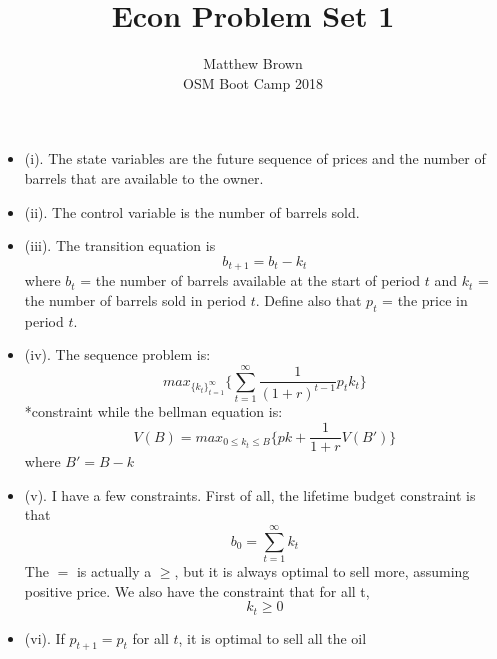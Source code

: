 \documentclass[12pt]{article}
\newenvironment{problem}[2][Problem]{\begin{trivlist}
\item[\hskip \labelsep {\bfseries #1}\hskip \labelsep {\bfseries #2.}]}{\end{trivlist}}
\theoremstyle{definition}
\theoremstyle{definition}
\theoremstyle{definition}
\theoremstyle{definition}
\begin{document}
\title{Econ Problem Set 1}
\author{Matthew Brown\\ 
OSM Boot Camp 2018} %
 
\maketitle
 
\begin{problem}{1}
\begin{itemize}
\item (i). The state variables are the future sequence of prices and the number of barrels that are available to the owner.
\item (ii). The control variable is the number of barrels sold.
\item (iii). The transition equation is 
$$ b_{t+1} = b_t - k_t $$
where $b_t$ = the number of barrels available at the start of period $t$ and $k_t$ = the number of barrels sold in period $t$. Define also that $p_t$ = the price in period $t$.
\item (iv). The sequence problem is:
$$ max_{\{k_t\}_{t=1}^\infty} \bigg\{ \sum_{t=1}^{\infty} \frac{1}{(1+r)^{t-1}}p_tk_t \bigg\} $$
*constraint
while the bellman equation is:
$$ V(B) = max_{0 \leq k_t \leq B} \bigg\{ pk + \frac{1}{1+r}V(B') \bigg\} $$
where $B' = B-k$
\item (v). I have a few constraints. First of all, the lifetime budget constraint is that
$$b_0 = \sum_{t=1}^\infty k_t$$ 
The $=$ is actually a $\geq$, but it is always optimal to sell more, assuming positive price. 
We also have the constraint that for all t, 
$$k_t \geq 0$$
\item (vi). If $p_{t+1} = p_t$ for all $t$, it is optimal to sell all the oil 
\end{itemize}
\end{problem}
\end{document}
